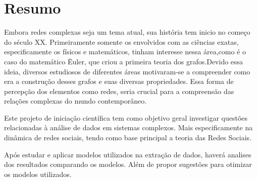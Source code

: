 \chapter{Resumo}

Embora redes complexas seja um tema atual, sua história tem inicio no começo do século XX. Primeiramente somente os envolvidos com as ciências exatas, especificamente os físicos e matemáticos, tinham interesse nessa área,como é o caso do matemático Ëuler, que criou a primeira teoria dos grafos.Devido essa ideia, diversos estudiosos de diferentes áreas motivaram-se a compreender como era a construção desses grafos e suas diversas propriedades. Essa forma de percepção dos elementos como redes, seria crucial para a compreensão das relações complexas do mundo contemporâneo.

          Este projeto de iniciação científica tem como objetivo geral investigar questões relacionadas à análise de dados em sistemas complexos. Mais especificamente na dinâmica de redes sociais, tendo como base principal a teoria das Redes Sociais. 
          
          
         Após estudar e aplicar modelos utilizados na extração de dados, haverá analises dos resultados comparando os modelos. Além de propor sugestões para otimizar os modelos utilizados.
